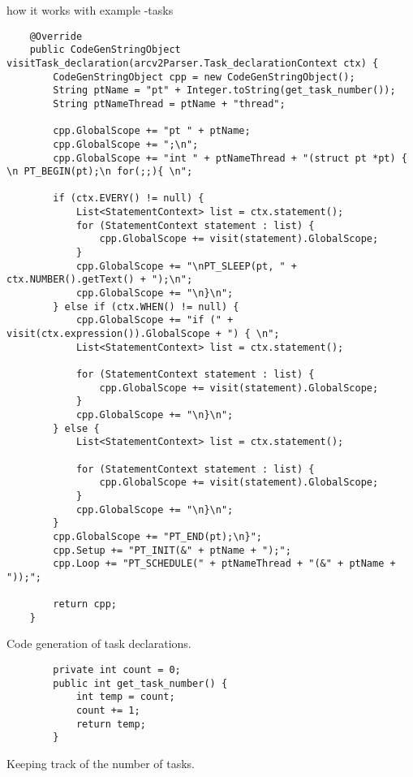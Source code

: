 how it works with example -tasks
\begin{listing}[htb!]
    \begin{verbatim}
    @Override
    public CodeGenStringObject visitTask_declaration(arcv2Parser.Task_declarationContext ctx) {
        CodeGenStringObject cpp = new CodeGenStringObject();
        String ptName = "pt" + Integer.toString(get_task_number());
        String ptNameThread = ptName + "thread";

        cpp.GlobalScope += "pt " + ptName;
        cpp.GlobalScope += ";\n";
        cpp.GlobalScope += "int " + ptNameThread + "(struct pt *pt) { \n PT_BEGIN(pt);\n for(;;){ \n";

        if (ctx.EVERY() != null) {
            List<StatementContext> list = ctx.statement();
            for (StatementContext statement : list) {
                cpp.GlobalScope += visit(statement).GlobalScope;
            }
            cpp.GlobalScope += "\nPT_SLEEP(pt, " + ctx.NUMBER().getText() + ");\n";
            cpp.GlobalScope += "\n}\n";
        } else if (ctx.WHEN() != null) {
            cpp.GlobalScope += "if (" + visit(ctx.expression()).GlobalScope + ") { \n";
            List<StatementContext> list = ctx.statement();

            for (StatementContext statement : list) {
                cpp.GlobalScope += visit(statement).GlobalScope;
            }
            cpp.GlobalScope += "\n}\n";
        } else {
            List<StatementContext> list = ctx.statement();
            
            for (StatementContext statement : list) {
                cpp.GlobalScope += visit(statement).GlobalScope;
            }
            cpp.GlobalScope += "\n}\n";
        }
        cpp.GlobalScope += "PT_END(pt);\n}";
        cpp.Setup += "PT_INIT(&" + ptName + ");";
        cpp.Loop += "PT_SCHEDULE(" + ptNameThread + "(&" + ptName + "));";

        return cpp;
    }
    \end{verbatim}
    \caption{Code generation of task declarations.}
    \label{lst:codeGenTask}
\end{listing}

\begin{listing}
    \begin{verbatim}
        private int count = 0;
        public int get_task_number() {
            int temp = count;
            count += 1;
            return temp;
        }
    \end{verbatim}
    \caption{Keeping track of the number of tasks.}
    \label{lst:codeGenTaskNumber}
\end{listing}


